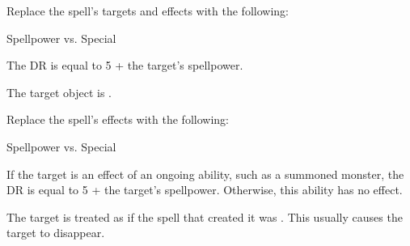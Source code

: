 


Replace the spell's targets and effects with the following:
\begin{spellcontent}

\begin{augmenttargetinginfo}




\end{augmenttargetinginfo}


\begin{augmenteffects}




\begin{spellattack}{Spellpower vs. Special}


\spellspecial
The DR is equal to 5 + the target's spellpower.



\spellsuccess
The target object is .



\end{spellattack}





\end{augmenteffects}

\end{spellcontent}








Replace the spell's effects with the following:
\begin{spellcontent}

\begin{augmenteffects}




\begin{spellattack}{Spellpower vs. Special}


\spellspecial
If the target is an effect of an ongoing  ability, such as a summoned monster, the DR is equal to 5 + the target's spellpower.
Otherwise, this ability has no effect.



\spellsuccess
The target is treated as if the spell that created it was .
This usually causes the target to disappear.



\end{spellattack}





\end{augmenteffects}

\end{spellcontent}





